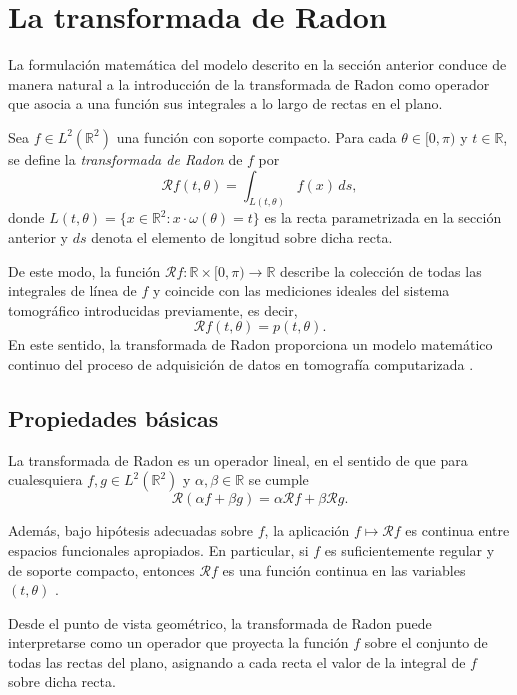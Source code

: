 \section{La transformada de Radon}

La formulación matemática del modelo descrito en la sección anterior conduce de manera natural a la introducción de la transformada de Radon como operador que asocia a una función sus integrales a lo largo de rectas en el plano.

Sea $f \in L^{2}(\mathbb{R}^{2})$ una función con soporte compacto. Para cada $\theta \in [0,\pi)$ y $t \in \mathbb{R}$, se define la \emph{transformada de Radon} de $f$ por
\[
\mathcal{R}f(t,\theta) = \int_{L(t,\theta)} f(x)\, ds,
\]
donde $L(t,\theta) = \{ x \in \mathbb{R}^{2} : x \cdot \omega(\theta) = t \}$ es la recta parametrizada en la sección anterior y $ds$ denota el elemento de longitud sobre dicha recta.

De este modo, la función $\mathcal{R}f : \mathbb{R} \times [0,\pi) \to \mathbb{R}$ describe la colección de todas las integrales de línea de $f$ y coincide con las mediciones ideales del sistema tomográfico introducidas previamente, es decir,
\[
\mathcal{R}f(t,\theta) = p(t,\theta).
\]
En este sentido, la transformada de Radon proporciona un modelo matemático continuo del proceso de adquisición de datos en tomografía computarizada \cite{kak_slaney1988,natterer2001,kuchment2014}.

\subsection*{Propiedades básicas}

La transformada de Radon es un operador lineal, en el sentido de que para cualesquiera $f,g \in L^{2}(\mathbb{R}^{2})$ y $\alpha,\beta \in \mathbb{R}$ se cumple
\[
\mathcal{R}(\alpha f + \beta g) = \alpha \mathcal{R}f + \beta \mathcal{R}g.
\]

Además, bajo hipótesis adecuadas sobre $f$, la aplicación $f \mapsto \mathcal{R}f$ es continua entre espacios funcionales apropiados. En particular, si $f$ es suficientemente regular y de soporte compacto, entonces $\mathcal{R}f$ es una función continua en las variables $(t,\theta)$ \cite{helgason2011,kuchment2014}.

Desde el punto de vista geométrico, la transformada de Radon puede interpretarse como un operador que proyecta la función $f$ sobre el conjunto de todas las rectas del plano, asignando a cada recta el valor de la integral de $f$ sobre dicha recta.

